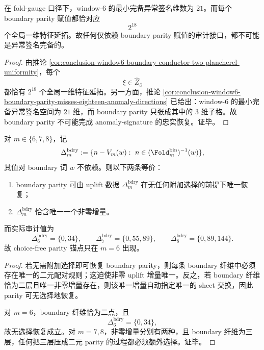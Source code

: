 \begin{corollary}\label{cor:conclusion-window6-boundary-parity-never-anomaly-complete}
在 fold-gauge 口径下，window-\(6\) 的最小完备异常签名维数为 \(21\)。而每个 boundary parity 赋值都恰对应
\[
2^{18}
\]
个全局一维特征延拓。故任何仅依赖 boundary parity 赋值的审计接口，都不可能是异常签名完备的。
\end{corollary}
\begin{proof}
由推论 \ref{cor:conclusion-window6-boundary-conductor-two-plancherel-uniformity}，每个
\[
\xi\in \widehat Z_{\partial}
\]
都恰有 \(2^{18}\) 个全局一维特征延拓。另一方面，推论 \ref{cor:conclusion-window6-boundary-parity-misses-eighteen-anomaly-directions} 已给出：window-\(6\) 的最小完备异常签名空间为 \(21\) 维，而 boundary parity 只张成其中的 \(3\) 维子格。故 boundary parity 不可能完成 anomaly-signature 的忠实恢复。证毕。
\end{proof}

\begin{theorem}[dyadic boundary uplift 的 choice-free parity 锚点仅在 \texorpdfstring{$m=6$}{m=6} 出现]\label{thm:conclusion-window6-choicefree-parity-anchor-isolated}
对 \(m\in\{6,7,8\}\)，记
\[
\Delta_m^{\mathrm{bdry}}
:=
\{n-V_m(w):\ n\in (\Fold_m^{\mathrm{bin}})^{-1}(w)\},
\]
其值对 boundary 词 \(w\) 不依赖。则以下两条等价：
\begin{enumerate}
  \item boundary parity 可由 uplift 数据 \(\Delta_m^{\mathrm{bdry}}\) 在无任何附加选择的前提下唯一恢复；
  \item \(\Delta_m^{\mathrm{bdry}}\) 恰含唯一一个非零增量。
\end{enumerate}
而实际审计值为
\[
\Delta_6^{\mathrm{bdry}}=\{0,34\},
\qquad
\Delta_7^{\mathrm{bdry}}=\{0,55,89\},
\qquad
\Delta_8^{\mathrm{bdry}}=\{0,89,144\}.
\]
故 choice-free parity 锚点只在 \(m=6\) 出现。
\end{theorem}
\begin{proof}
若无需附加选择即可恢复 boundary parity，则每条 boundary 纤维中必须存在唯一的二元配对规则；这迫使非零 uplift 增量唯一。反之，若 boundary 纤维恰为二层且唯一非零增量存在，则该唯一增量自动指定唯一的 sheet 交换，因此 parity 可无选择地恢复。

对 \(m=6\)，boundary 纤维恰为二点，且
\[
\Delta_6^{\mathrm{bdry}}=\{0,34\},
\]
故无选择恢复成立。对 \(m=7,8\)，非零增量分别有两种，且 boundary 纤维为三层，任何把三层压成二元 parity 的过程都必须额外选择。证毕。
\end{proof}

